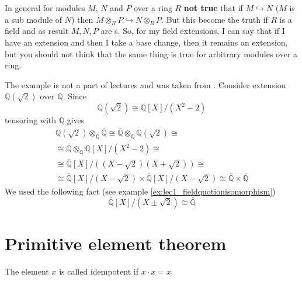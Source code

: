 \begin{remark}
In general for modules $M$, $N$ and $P$ over a ring $R$ \textbf{not true} that
if $M \hookrightarrow N$ ($M$ is a sub module of $N$) then
$M \otimes_R P \hookrightarrow N \otimes_R P$. But this become the
truth if $R$ is a field and as result $M,N,P$ are
s. So, for my field extensions, I can say
that if I have an extension and then I take a base change, then it
remains an extension, but  you should not think that the same thing is
true for arbitrary modules over a ring.  
\end{remark}

\begin{example}
  The example is not a part of lectures and was taken from
  \cite{bib:KeithConradSeparability2}.
  Consider extension $\mathbb{Q}\left(\sqrt{2}\right)$ over
  $\mathbb{Q}$. Since
  \[
  \mathbb{Q}\left(\sqrt{2}\right) \cong
  \mathbb{Q}\left[X\right]/\left(X^2 - 2\right)
  \]
  tensoring with $\mathbb{Q}$ gives
  \begin{eqnarray}
    \mathbb{Q}\left(\sqrt{2}\right) \otimes_{\mathbb{Q}}
    \bar{\mathbb{Q}} \cong
    \bar{\mathbb{Q}} \otimes_{\mathbb{Q}}
    \mathbb{Q}\left(\sqrt{2}\right)
    \cong
    \nonumber \\
    \cong
    \bar{\mathbb{Q}} \otimes_{\mathbb{Q}}
    \mathbb{Q}\left[X\right]/\left(X^2 - 2\right)
    \cong
    \nonumber \\
    \cong
    \bar{\mathbb{Q}}\left[X\right]/
    \left(
    \left(X - \sqrt{2}\right)
    \left(X + \sqrt{2}\right)
    \right)
    \cong
    \nonumber \\
    \cong
    \bar{\mathbb{Q}}\left[X\right]/\left(X - \sqrt{2}\right)
    \times
    \bar{\mathbb{Q}}\left[X\right]/\left(X - \sqrt{2}\right)
    \cong
    \bar{\mathbb{Q}} \times \bar{\mathbb{Q}}
    \nonumber
  \end{eqnarray}
  We used the following fact (see example
  \ref{ex:lec1_fieldquotionisomorphism}) 
  \[
  \bar{\mathbb{Q}}\left[X\right]/\left(X \pm \sqrt{2}\right)
  \cong
  \bar{\mathbb{Q}}
  \]  
  \label{ex:lec5_conrad}
\end{example}

\section{Primitive element theorem}

\begin{definition}[Idempotent]
  The element $x$ is called idempotent if $x \cdot x = x$
  \label{def:idempotent}
\end{definition}

